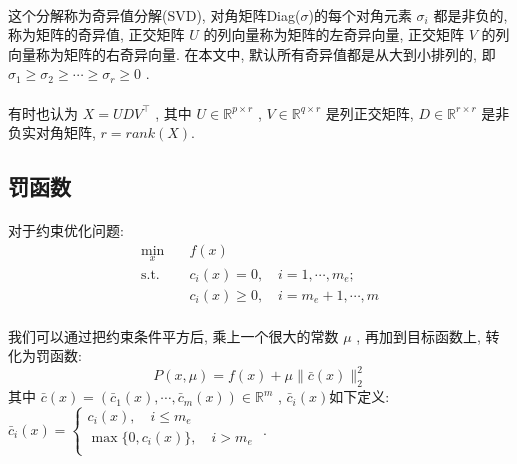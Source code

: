 \documentclass[a4paper, UTF8]{ctexart}				%
\numberwithin{equation}{section}				%
\begin{document}
			\paragraph{}
				\quad 这个分解称为奇异值分解(SVD), 对角矩阵Diag($\sigma$)的每个对角元素 $\sigma_i$ 都是非负的, 称为矩阵的奇异值, 正交矩阵 $U$ 的列向量称为矩阵的左奇异向量, 正交矩阵 $V$ 的列向量称为矩阵的右奇异向量. 在本文中, 默认所有奇异值都是从大到小排列的, 即 $\sigma_1 \ge \sigma_2 \ge \cdots \ge \sigma_r \ge 0$ .

			\paragraph{}
				\quad 有时也认为 $X = U D V^\top$ , 其中 $U \in \mathbb{R}^{p \times r}$ , $V \in \mathbb{R}^{q \times r}$ 是列正交矩阵, $D \in \mathbb{R}^{r \times r}$ 是非负实对角矩阵, $r = rank(X)$.


		\subsection{罚函数}
			\paragraph{}
				\quad 对于约束优化问题:
				\begin{equation}
					\begin{split}\label{Q}
						\min_x \quad
							& f(x)\\
						\text{s.t.} \quad
							& c_i(x) = 0, \quad i = 1, \cdots, m_e;\\
							& c_i(x) \ge 0, \quad i = m_e + 1, \cdots, m
					\end{split}
				\end{equation}
			\paragraph{}
				\quad 我们可以通过把约束条件平方后, 乘上一个很大的常数 $\mu$ , 再加到目标函数上, 转化为罚函数:
				\begin{equation}
					P(x, \mu) = f(x) + \mu \lVert{\bar{c}(x)}\rVert^2_2
				\end{equation}
				其中
				$
						\bar{c}(x)
					=	(\bar{c}_1(x), \cdots, \bar{c}_m(x))
					\in	\mathbb{R}^{m}
				$ , \quad
				$\bar{c}_i(x)$如下定义:
				$
						\bar{c}_i(x)
					=	\begin{cases}
							c_i(x), \quad i \leq m_e\\
							\max \{0, c_i(x)\}, \quad i > m_e \\
						\end{cases}
				$ .
\end{document}
